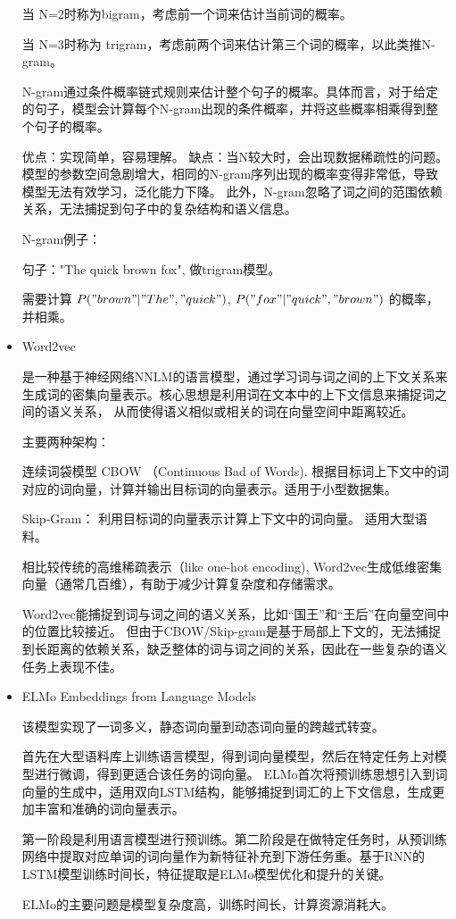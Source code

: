 \documentclass{article}
\begin{document}
\begin{itemize}
    当 N=2时称为bigram，考虑前一个词来估计当前词的概率。

    当 N=3时称为 trigram，考虑前两个词来估计第三个词的概率，以此类推N-gram。

    N-gram通过条件概率链式规则来估计整个句子的概率。具体而言，对于给定的句子，模型会计算每个N-gram出现的条件概率，并将这些概率相乘得到整个句子的概率。

    优点：实现简单，容易理解。 缺点：当N较大时，会出现数据稀疏性的问题。模型的参数空间急剧增大，相同的N-gram序列出现的概率变得非常低，导致模型无法有效学习，泛化能力下降。
    此外，N-gram忽略了词之间的范围依赖关系，无法捕捉到句子中的复杂结构和语义信息。

    N-gram例子：

    句子："The quick brown fox", 做trigram模型。

    需要计算 $P("brown" | "The", "quick") $, $P("fox" | "quick", "brown") $ 的概率，并相乘。


    \item Word2vec
    
    是一种基于神经网络NNLM的语言模型，通过学习词与词之间的上下文关系来生成词的密集向量表示。核心思想是利用词在文本中的上下文信息来捕捉词之间的语义关系，
    从而使得语义相似或相关的词在向量空间中距离较近。

    主要两种架构：

    连续词袋模型 CBOW （Continuous Bad of Words). 根据目标词上下文中的词对应的词向量，计算并输出目标词的向量表示。适用于小型数据集。

    Skip-Gram： 利用目标词的向量表示计算上下文中的词向量。 适用大型语料。

    相比较传统的高维稀疏表示（like one-hot encoding), Word2vec生成低维密集向量（通常几百维），有助于减少计算复杂度和存储需求。

    Word2vec能捕捉到词与词之间的语义关系，比如“国王”和“王后”在向量空间中的位置比较接近。
    但由于CBOW/Skip-gram是基于局部上下文的，无法捕捉到长距离的依赖关系，缺乏整体的词与词之间的关系，因此在一些复杂的语义任务上表现不佳。


    \item ELMo Embeddings from Language Models
    
    该模型实现了一词多义，静态词向量到动态词向量的跨越式转变。

    首先在大型语料库上训练语言模型，得到词向量模型，然后在特定任务上对模型进行微调，得到更适合该任务的词向量。
     ELMo首次将预训练思想引入到词向量的生成中，适用双向LSTM结构，能够捕捉到词汇的上下文信息，生成更加丰富和准确的词向量表示。

     第一阶段是利用语言模型进行预训练。第二阶段是在做特定任务时，从预训练网络中提取对应单词的词向量作为新特征补充到下游任务重。基于RNN的LSTM模型训练时间长，特征提取是ELMo模型优化和提升的关键。

     ELMo的主要问题是模型复杂度高，训练时间长，计算资源消耗大。

\end{itemize}
\end{document}
